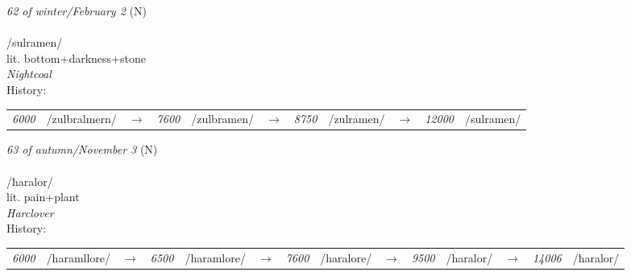 \vspace{15pt}
\begin{nopagebreak}
 \textit{62 of winter/February 2} (N)\\
\\
\noindent /sulr{\textprimstress}amen/\\
\noindent lit. bottom+darkness+stone\\
\noindent \textit{Nightcoal}\\


\noindent History:

\vspace{-0pt}
\hspace{40pt}
\begin{tabular}{ccc}
\textit{6000} & /zulbralmern/&$\rightarrow$ & \textit{7600} & /zulbramen/&$\rightarrow$ & \textit{8750} & /zulramen/&$\rightarrow$ & \textit{12000} & /sulramen/& \\
\end{tabular}

\vspace{20pt}\hline

\end{nopagebreak}
\filbreak



\vspace{15pt}
\begin{nopagebreak}
 \textit{63 of autumn/November 3} (N)\\
\\
\noindent /ħar{\textprimstress}alor/\\
\noindent lit. pain+plant\\
\noindent \textit{Harclover}\\


\noindent History:

\vspace{-0pt}
\hspace{40pt}
\begin{tabular}{ccc}
\textit{6000} & /haramllore/&$\rightarrow$ & \textit{6500} & /haramlore/&$\rightarrow$ & \textit{7600} & /haralore/&$\rightarrow$ & \textit{9500} & /haralor/&$\rightarrow$ & \textit{14006} & /ħaralor/& \\
\end{tabular}

\vspace{20pt}\hline

\end{nopagebreak}
\filbreak



